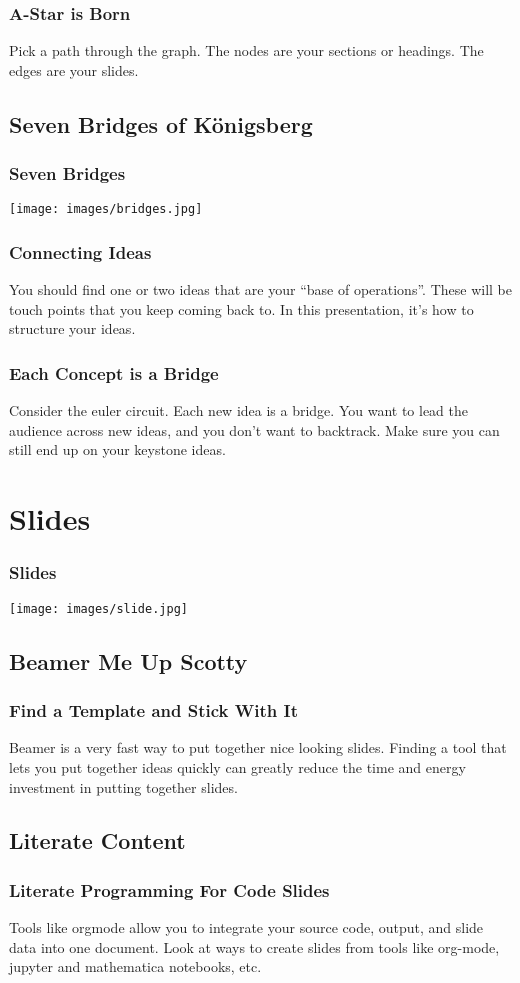 \documentclass{beamer}
\begin{document}
\begin{frame}
  \frametitle{A-Star is Born}
  Pick a path through the graph.  The nodes are your sections or
  headings.  The edges are your slides.
\end{frame}


\subsection{Seven Bridges of Königsberg}

\begin{frame}
  \frametitle{Seven Bridges}
  \texttt{[image: images/bridges.jpg]}
\end{frame}

\begin{frame}
  \frametitle{Connecting Ideas}
  You should find one or two ideas that are your ``base of
  operations''.  These will be touch points that you keep coming back
  to.  In this presentation, it's how to structure your ideas.
\end{frame}

\begin{frame}
  \frametitle{Each Concept is a Bridge}
  Consider the euler circuit.  Each new idea is a bridge.  You want to
  lead the audience across new ideas, and you don't want to backtrack.
  Make sure you can still end up on your keystone ideas.
\end{frame}


\section{Slides}

\begin{frame}
  \frametitle{Slides}
  \texttt{[image: images/slide.jpg]}
\end{frame}

\subsection{Beamer Me Up Scotty}
\begin{frame}
  \frametitle{Find a Template and Stick With It}
  Beamer is a very fast way to put together nice looking slides.
  Finding a tool that lets you put together ideas quickly can greatly
  reduce the time and energy investment in putting together slides.
\end{frame}

\subsection{Literate Content}
\begin{frame}
  \frametitle{Literate Programming For Code Slides}
  Tools like orgmode allow you to integrate your source code, output,
  and slide data into one document.  Look at ways to create slides
  from tools like org-mode, jupyter and mathematica notebooks, etc.
\end{frame}
\end{document}
